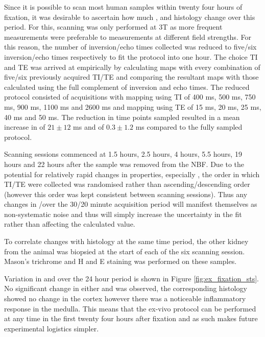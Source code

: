 Since it is possible to scan most human samples within twenty four hours of fixation, it was desirable to ascertain how much \tone, \ttwostar and histology change over this period. For this, scanning was only performed at 3T as more frequent measurements were preferable to measurements at different field strengths. For this reason, the number of inversion/echo times collected was reduced to five/six inversion/echo times respectively to fit the protocol into one hour. The choice \ac{TI} and \ac{TE} was arrived at empirically by calculating maps with every combination of five/six previously acquired \ac{TI}/\ac{TE} and comparing the resultant maps with those calculated using the full complement of inversion and echo times. The reduced protocol consisted of acquisitions with \tone mapping using \ac{TI} of 400 ms, 500 ms, 750 ms, 900 ms, 1100 ms and 2600 ms and \ttwostar mapping using \ac{TE} of 15 ms, 20 ms, 25 ms, 40 ms and 50 ms. The reduction in time points sampled resulted in a mean increase in \tone of $21 \pm 12$ ms and \ttwostar of $0.3 \pm 1.2$ ms compared to the fully sampled protocol.

Scanning sessions commenced at 1.5 hours, 2.5 hours, 4 hours, 5.5 hours, 19 hours and 22 hours after the sample was removed from the \ac{NBF}. Due to the potential for relatively rapid changes in properties, especially \tone, the order in which \ac{TI}/\ac{TE} were collected was randomised rather than ascending/descending order (however this order was kept consistent between scanning sessions). Thus any changes in \tone/\ttwostar over the 30/20 minute acquisition period will manifest themselves as non-systematic noise and thus will simply increase the uncertainty in the fit rather than affecting the calculated value.

\newpage
To correlate changes with histology at the same time period, the other kidney from the animal was biopsied at the start of each of the six scanning session. Mason's trichrome and \ac{H and E} staining was performed on these samples.

Variation in \tone and \ttwostar over the 24 hour period is shown in Figure \ref{fig:ex_fixation_sts}. No significant change in either \tone and \ttwostar was observed, the corresponding histology showed no change in the cortex however there was a noticeable inflammatory response in the medulla. This means that the ex-vivo protocol can be performed at any time in the first twenty four hours after fixation and as such makes future experimental logistics simpler.


